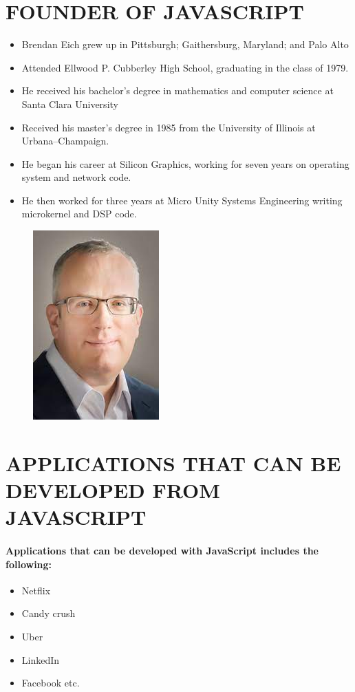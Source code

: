 \documentclass{article}
\begin{document}
	\section*{FOUNDER OF JAVASCRIPT}
		\begin{itemize}
		\item Brendan Eich grew up in Pittsburgh; Gaithersburg, Maryland; and Palo Alto
		\item Attended Ellwood P. Cubberley High School, graduating in the class of 1979.
		\item He received his bachelor's degree in mathematics and computer science at Santa Clara University
		\item Received his master's degree in 1985 from the University of Illinois at Urbana–Champaign.
		\item He began his career at Silicon Graphics, working for seven years on operating system and network code.
		\item He then worked for three years at Micro Unity Systems Engineering writing microkernel and DSP code.
	\end{itemize}
\begin{figure}
		\begin{center}
	\includegraphics[width=0.4\linewidth]{brendan.jpg}
\end{center}
\end{figure}
		\newpage
	\section*{APPLICATIONS THAT CAN BE DEVELOPED FROM JAVASCRIPT}
	\paragraph{Applications that can be developed with JavaScript includes the following:
	}
\begin{itemize}
	\item Netflix
	\item Candy crush
	\item Uber
	\item LinkedIn
	\item Facebook etc.
\end{itemize}
\newpage
\end{document}
